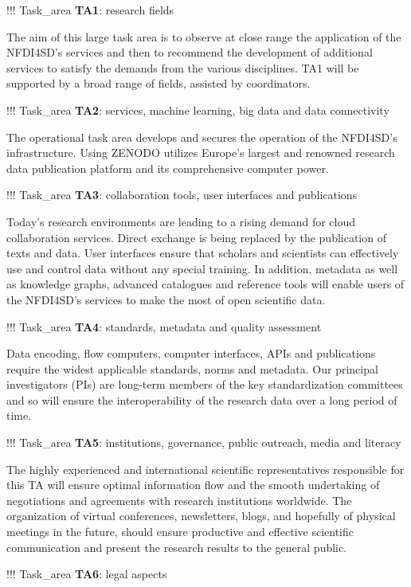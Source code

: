 !!! Task\_area \textbf{TA1}: research fields

The aim of this large task area is to observe at close range the
application of the NFDI4SD's services and then to recommend the
development of additional services to satisfy the demands from the
various disciplines. TA1 will be supported by a broad range of fields,
assisted by coordinators.

!!! Task\_area \textbf{TA2}: services, machine learning, big data and
data connectivity

The operational task area develops and secures the operation of the
NFDI4SD's infrastructure. Using ZENODO utilizes Europe's largest and
renowned research data publication platform and its comprehensive
computer power.

!!! Task\_area \textbf{TA3}: collaboration tools, user interfaces and
publications

Today's research environments are leading to a rising demand for cloud
collaboration services. Direct exchange is being replaced by the
publication of texts and data. User interfaces ensure that scholars and
scientists can effectively use and control data without any special
training. In addition, metadata as well as knowledge graphs, advanced
catalogues and reference tools will enable users of the NFDI4SD's
services to make the most of open scientific data.

!!! Task\_area \textbf{TA4}: standards, metadata and quality assessment

Data encoding, flow computers, computer interfaces, APIs and
publications require the widest applicable standards, norms and
metadata. Our principal investigators (PIs) are long-term members of the
key standardization committees and so will ensure the interoperability
of the research data over a long period of time.

!!! Task\_area \textbf{TA5}: institutions, governance, public outreach,
media and literacy

The highly experienced and international scientific representatives
responsible for this TA will ensure optimal information flow and the
smooth undertaking of negotiations and agreements with research
institutions worldwide. The organization of virtual conferences,
newsletters, blogs, and hopefully of physical meetings in the future,
should ensure productive and effective scientific communication and
present the research results to the general public.

!!! Task\_area \textbf{TA6}: legal aspects

